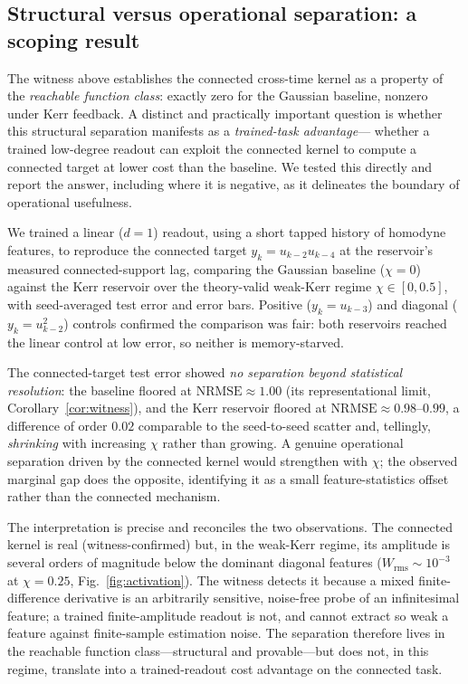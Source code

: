 \documentclass[11pt]{article}
\theoremstyle{remark}
\begin{document}
\subsection{Structural versus operational separation: a scoping result}
\label{sec:operational}

The witness above establishes the connected cross-time kernel as a property of
the \emph{reachable function class}: exactly zero for the Gaussian baseline,
nonzero under Kerr feedback. A distinct and practically important question is
whether this structural separation manifests as a \emph{trained-task advantage}---
whether a trained low-degree readout can exploit the connected kernel to compute a
connected target at lower cost than the baseline. We tested this directly and
report the answer, including where it is negative, as it delineates the boundary
of operational usefulness.

We trained a linear ($d=1$) readout, using a short tapped history of homodyne
features, to reproduce the connected target $y_k=u_{k-2}u_{k-4}$ at the
reservoir's measured connected-support lag, comparing the Gaussian baseline
($\chi=0$) against the Kerr reservoir over the theory-valid weak-Kerr regime
$\chi\in[0,0.5]$, with seed-averaged test error and error bars. Positive
($y_k=u_{k-3}$) and diagonal ($y_k=u_{k-2}^2$) controls confirmed the comparison
was fair: both reservoirs reached the linear control at low error, so neither is
memory-starved.

The connected-target test error showed \emph{no separation beyond statistical
resolution}: the baseline floored at $\mathrm{NRMSE}\approx1.00$ (its
representational limit, Corollary~\ref{cor:witness}), and the Kerr reservoir
floored at $\mathrm{NRMSE}\approx0.98$--$0.99$, a difference of order $0.02$
comparable to the seed-to-seed scatter and, tellingly, \emph{shrinking} with
increasing $\chi$ rather than growing. A genuine operational separation driven by
the connected kernel would strengthen with $\chi$; the observed marginal gap does
the opposite, identifying it as a small feature-statistics offset rather than the
connected mechanism.

The interpretation is precise and reconciles the two observations. The connected
kernel is real (witness-confirmed) but, in the weak-Kerr regime, its amplitude is
several orders of magnitude below the dominant diagonal features
($W_{\mathrm{rms}}\sim10^{-3}$ at $\chi=0.25$, Fig.~\ref{fig:activation}). The
witness detects it because a mixed finite-difference derivative is an arbitrarily
sensitive, noise-free probe of an infinitesimal feature; a trained
finite-amplitude readout is not, and cannot extract so weak a feature against
finite-sample estimation noise. The separation therefore lives in the reachable
function class---structural and provable---but does not, in this regime, translate
into a trained-readout cost advantage on the connected task.
\end{document}
